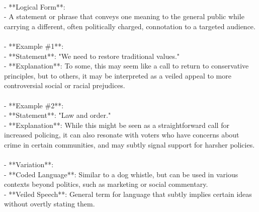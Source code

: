 \documentclass[a4paper,12pt,single,pdftex]{scrbook}
\begin{document}
    
      
    \\

    
      - **Logical Form**:
    \\

    
        - A statement or phrase that conveys one meaning to the general public while carrying a different, often politically charged, connotation to a targeted audience.
    \\

    
      
    \\

    
      - **Example \#1**:
    \\

    
        - **Statement**: "We need to restore traditional values."
    \\

    
        - **Explanation**: To some, this may seem like a call to return to conservative principles, but to others, it may be interpreted as a veiled appeal to more controversial social or racial prejudices.
    \\

    
      
    \\

    
      - **Example \#2**:
    \\

    
        - **Statement**: "Law and order."
    \\

    
        - **Explanation**: While this might be seen as a straightforward call for increased policing, it can also resonate with voters who have concerns about crime in certain communities, and may subtly signal support for harsher policies.
    \\

    
      
    \\

    
      - **Variation**:
    \\

    
        - **Coded Language**: Similar to a dog whistle, but can be used in various contexts beyond politics, such as marketing or social commentary.
    \\

    
        - **Veiled Speech**: General term for language that subtly implies certain ideas without overtly stating them.
    \\
\end{document}
